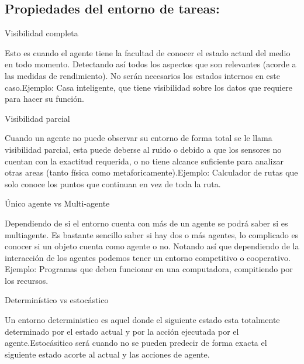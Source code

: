 \documentclass{article}
\begin{document}
\subsection{Propiedades del entorno de tareas:} %


\vspace{5mm}

Visibilidad completa
\vspace{5mm}


Esto es cuando el agente tiene la facultad de conocer el estado actual del medio en todo momento. Detectando así todos los aspectos que son relevantes (acorde a las medidas de rendimiento).  No serán necesarios los estados internos en este caso.Ejemplo: Casa inteligente, que tiene visibilidad sobre los datos que requiere para hacer su función.

\vspace{5mm}

Visibilidad parcial
\vspace{5mm}

Cuando un agente no puede observar su entorno de forma total se le llama visibilidad parcial, esta puede deberse al ruido o debido a que los sensores no cuentan con la exactitud requerida, o no tiene alcance suficiente para analizar otras areas (tanto física como metaforicamente).Ejemplo: Calculador de rutas que solo conoce los puntos que continuan en vez de toda la ruta.

\vspace{5mm}

Único agente vs Multi-agente

\vspace{5mm}
Dependiendo de si el entorno cuenta con más de un agente se podrá saber si es multiagente. Es bastante sencillo saber si hay dos o más agentes, lo complicado es conocer si un objeto cuenta como agente o no. Notando así que dependiendo de la interacción de los agentes podemos tener un entorno competitivo o cooperativo. Ejemplo: Programas que deben funcionar en una computadora, compitiendo por los recursos.

\vspace{5mm}

Determinístico vs estocástico

\vspace{5mm}

Un entorno deterministico es aquel donde el siguiente estado esta totalmente determinado por el estado actual  y por la acción ejecutada por el agente.Estocásitico será cuando no se pueden predecir de forma exacta el siguiente estado acorte al actual y las acciones de agente.
\end{document}
